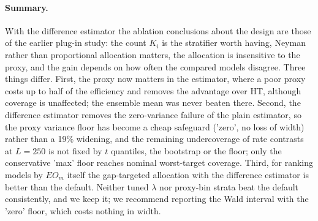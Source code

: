 \paragraph{Summary.} With the difference estimator the ablation conclusions about the design are those of the earlier plug-in study: the count $K_i$ is the stratifier worth having, Neyman rather than proportional allocation matters, the allocation is insensitive to the proxy, and the gain depends on how often the compared models disagree. Three things differ. First, the proxy now matters in the estimator, where a poor proxy costs up to half of the efficiency and removes the advantage over HT, although coverage is unaffected; the ensemble mean was never beaten there. Second, the difference estimator removes the zero-variance failure of the plain estimator, so the proxy variance floor has become a cheap safeguard ('zero', no loss of width) rather than a 19\% widening, and the remaining undercoverage of rate contrasts at $L=250$ is not fixed by $t$ quantiles, the bootstrap or the floor; only the conservative 'max' floor reaches nominal worst-target coverage. Third, for ranking models by $EO_m$ itself the gap-targeted allocation with the difference estimator is better than the default. Neither tuned $\lambda$ nor proxy-bin strata beat the default consistently, and we keep it; we recommend reporting the Wald interval with the 'zero' floor, which costs nothing in width.
